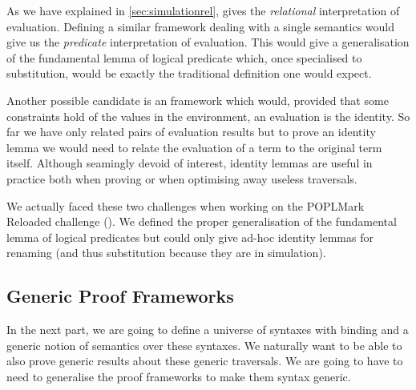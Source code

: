As we have explained in \cref{sec:simulationrel},  gives the \emph{relational}
interpretation of evaluation. Defining a similar framework dealing with a single semantics would
give us the \emph{predicate} interpretation of evaluation. This would give a generalisation of
the fundamental lemma of logical predicate which, once specialised to substitution, would be
exactly the traditional definition one would expect.

Another possible candidate is an  framework which would, provided that some
constraints hold of the values in the environment, an evaluation is the identity. So far
we have only related pairs of evaluation results but to prove an identity lemma we would
need to relate the evaluation of a term to the original term itself. Although seamingly
devoid of interest, identity lemmas are useful in practice both when proving or when optimising
away useless traversals.

We actually faced these two challenges when working on the POPLMark Reloaded challenge
(\cite{poplmark2}). We defined the proper generalisation of the fundamental lemma of
logical predicates but could only give ad-hoc identity lemmas for renaming (and thus
substitution because they are in simulation).

\subsection{Generic Proof Frameworks}

In the next part, we are going to define a universe of syntaxes with binding and a generic
notion of semantics over these syntaxes. We naturally want to be able to also prove generic
results about these generic traversals. We are going to have to need to generalise the proof
frameworks to make them syntax generic.

